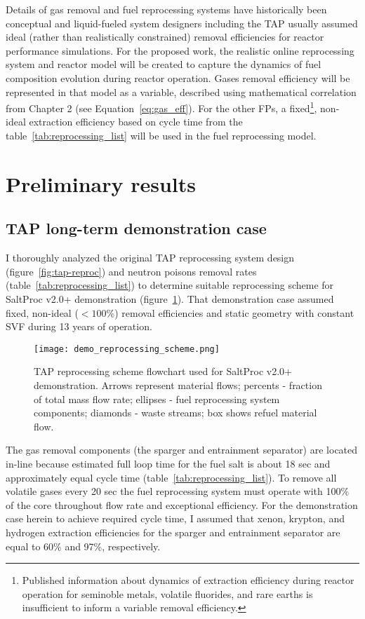 Details of gas removal and fuel reprocessing systems have historically 
been conceptual and liquid-fueled system designers including the \gls{TAP} 
usually assumed ideal (rather than realistically constrained) removal 
efficiencies for reactor performance simulations. For the  proposed work, the 
realistic online reprocessing system and reactor model will be created to 
capture the dynamics of fuel composition evolution during reactor operation. 
Gases removal efficiency will be represented in that model as a variable, 
described using mathematical correlation from Chapter 2 
(see Equation~\ref{eq:gas_eff}). For the other \glspl{FP}, a  
fixed\footnote{Published information about dynamics of extraction efficiency 
during reactor operation for seminoble metals, volatile fluorides, and rare 
earths is insufficient to inform a variable removal efficiency.}, non-ideal 
extraction efficiency based on cycle time from the  
table~\ref{tab:reprocessing_list} will be used in the fuel reprocessing model.

\section{Preliminary results} \label{sec:stage2-demo}
\subsection{TAP long-term demonstration case} 
I thoroughly analyzed the original \gls{TAP} reprocessing system design 
(figure~\ref{fig:tap-reproc}) and neutron poisons removal rates  
(table~\ref{tab:reprocessing_list}) to determine suitable reprocessing 
scheme for SaltProc v2.0+ demonstration (figure~\ref{fig:demo-repro-scheme}). 
That demonstration case assumed fixed, non-ideal ($<100$\%) removal 
efficiencies and static geometry with constant \gls{SVF} during 13 years of 
operation.
\begin{figure}[htp!] %
	\centering
	\texttt{[image: demo\_reprocessing\_scheme.png]}
	\caption{\gls{TAP} reprocessing scheme flowchart used for SaltProc v2.0+ 
		demonstration. Arrows represent material flows; percents - fraction of 
		total mass flow rate; ellipses - fuel reprocessing system components; 
		diamonds - waste streams; box shows refuel material flow.}
	\label{fig:demo-repro-scheme}
\end{figure}

The gas removal components (the sparger and entrainment separator) are located 
in-line because estimated full loop time for the fuel salt is about 
18 sec and approximately equal cycle time (table~\ref{tab:reprocessing_list}). 
To remove all volatile gases every 20 sec the fuel reprocessing system must 
operate with 100\% of the core throughout flow rate and exceptional 
efficiency. For the demonstration case herein to achieve required cycle time, 
I assumed that xenon, krypton, and hydrogen extraction efficiencies for the 
sparger and entrainment separator are equal to 60\% and 97\%, respectively.

